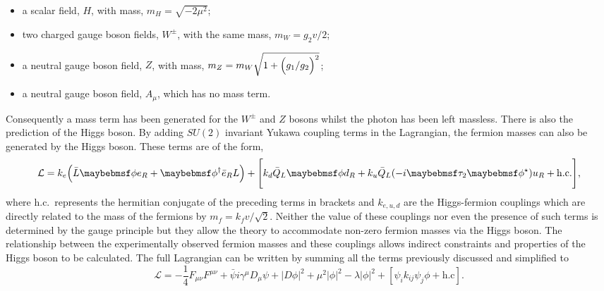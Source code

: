 \begin{itemize}
  \item a scalar field, $H$, with mass, $m_{H} = \sqrt{-2\mu^{2}}$;
  \item two charged gauge boson fields, $W^{\pm}$, with the same mass, $m_{W} = g_{2}v/2$;
  \item a neutral gauge boson field, $Z$, with mass, $m_{Z} = m_{W}\sqrt{1+\Bigl(g_{1}/g_{2}\Bigr)^{2}}$;
  \item a neutral gauge boson field, $A_{\mu}$, which has no mass term.
\end{itemize}

Consequently a mass term has been generated for the $W^{\pm}$ and $Z$ bosons whilst the photon has been left massless. There is also the prediction of the \SM Higgs boson. By adding $SU(2)$ invariant Yukawa coupling terms in the Lagrangian, the fermion masses can also be generated by the Higgs boson. These terms are of the form,
\begin{equation}
  \mathcal{L} = k_{e} \Bigl( \bar{L}\phi e_{R} + \phi^{\dagger}\bar{e}_{R} L \Bigr) + \Biggl[ k_{d}\bar{Q}_{L}\phi d_{R} + k_{u}\bar{Q}_{L}(-i\tau_{2}\phi^{\star})u_{R} + \mathrm{h.c.} \Bigg],
\end{equation}
where h.c.~represents the hermitian conjugate of the preceding terms in brackets and $k_{e,u,d}$ are the Higgs-fermion couplings which are directly related to the mass of the fermions by $m_{f}=k_{f}v/\sqrt{2}$. Neither the value of these couplings nor even the presence of such terms is determined by the gauge principle but they allow the theory to accommodate non-zero fermion masses via the Higgs boson. The relationship between the experimentally observed fermion masses and these couplings allows indirect constraints and properties of the Higgs boson to be calculated. The full \SM Lagrangian can be written by summing all the terms previously discussed and simplified to
\begin{equation}
  \mathcal{L} = -\frac{1}{4}F_{\mu\nu}F^{\mu\nu} + \bar{\psi}i\gamma^{\mu}D_{\mu}\psi + |D\phi|^{2} +\mu^{2}|\phi|^{2} -\lambda|\phi|^{2} + [ \psi_{i}k_{ij}\psi_{j}\phi + \mathrm{h.c} ].
\end{equation}


